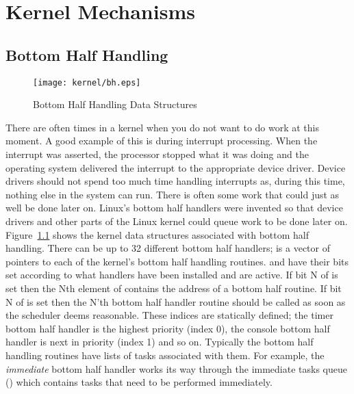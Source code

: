 \chapter{Kernel Mechanisms}
\label{kernel-chapter}

\section{Bottom Half Handling}
\label{kernel-bh-section}
\begin{figure}
\begin{center}
{\centering \texttt{[image: kernel/bh.eps]} \par}
\end{center}
\caption{Bottom Half Handling Data Structures}
\label{bh-figure}
\end{figure}
There are often times in a kernel when you do not want to do work at this moment.
A good example of this is during interrupt processing.
When the interrupt was asserted, the processor stopped what it was doing
and the operating system delivered the interrupt to the appropriate 
device driver.
Device drivers should not spend too much time handling interrupts as, during
this time, nothing else in the system can run.
There is often some work that could just as well be done later on.
Linux's bottom half handlers were invented so that device drivers and other
parts of the Linux kernel could queue work to be done later on.
Figure~\ref{bh-figure} shows the kernel data structures associated with bottom
half handling.
There can be up to 32 different bottom half handlers;  is a vector
of pointers to each of the kernel's bottom half handling routines.
 and  
have their bits set according to what handlers have been installed and are active.
If bit N of  is set then the Nth element of
 contains the address of a bottom half routine.
If bit N of  is set then the N'th bottom half handler routine
should be called as soon as the scheduler deems reasonable.
These indices are statically defined; the timer bottom half handler is the highest
priority (index 0), the console bottom half handler is next in priority (index 1) and
so on.
Typically the bottom half handling routines have lists of tasks associated with
them.
For example, the {\em immediate} bottom half handler works its way through the immediate
tasks queue () which contains tasks that need to be performed
immediately.

